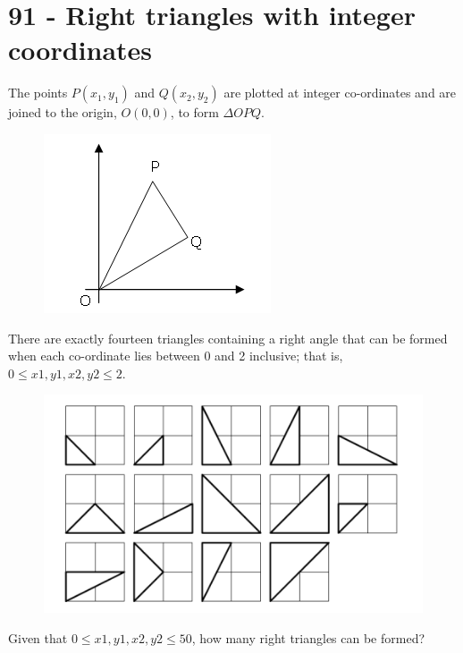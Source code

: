 \chapter*{91 - Right triangles with integer coordinates}

The points $P(x_1, y_1)$ and $Q(x_2, y_2)$ are plotted at integer co-ordinates and are joined to the origin, $O(0,0)$, to form $\Delta OPQ$.

\begin{figure}[H]
    \centering
    \includegraphics[scale=0.5]{images/pe911.png}
    \caption{}
    \label{fig:pe91a}
\end{figure}

There are exactly fourteen triangles containing a right angle that can be formed when each co-ordinate lies between 0 and 2 inclusive; that is, $0 \leq x1, y1, x2, y2\leq 2$.

\begin{figure}[H]
    \centering
    \includegraphics[scale=0.5]{images/pe912.png}
    \caption{}
    \label{fig:pe91b}
\end{figure}

Given that $0 \leq x1, y1, x2, y2 \leq 50$, how many right triangles can be formed?

